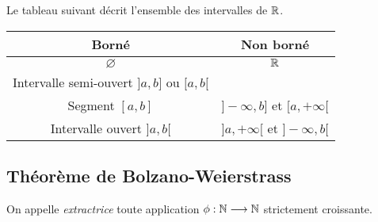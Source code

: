 \documentclass[../main.tex]{subfiles}
\begin{document}
\begin{prop}
    Le tableau suivant décrit l'ensemble des intervalles de $\mathbb R$.
    \begin{center}
    \begin{tabular}{|c|c|} \hline
        Borné & Non borné \\ \hline
        $\varnothing$ & $\mathbb R$ \\ \hline
        Intervalle semi-ouvert $]a,b]$ ou $[a,b[$ & \\ \hline
        Segment $[a,b]$ & $]-\infty,b]$ et $[a,+\infty[$ \\ \hline
        Intervalle ouvert $]a,b[$ & $]a,+\infty[$ et $]-\infty,b[$ \\ \hline
    \end{tabular}
    \end{center}
\end{prop}

\begin{comment}
\subsection{Densité d'une partie de $\R$}

\begin{mydef}[Densité]
    On dit que $A$ est dense dans $\R$ si pour tous réels $x$ et $y$ il existe un $a\in A\cap {]x,y[}$.
\end{mydef}

\begin{thm}[Propriété d'archimède]
    Soient $x<y$ deux réels avec $x>0$. Alors il existe $n\in\N$ tel que $y\leq nx$.
\end{thm}

\begin{prop}
    L'ensemble $\Q$ des nombres rationnels est dense dans $\R$.
\end{prop}

\begin{exo}[D]
    Le démontrer.
\end{exo}
\end{comment}

\subsection{Théorème de Bolzano-Weierstrass}

\begin{mydef}[Extractrice]
	On appelle \textit{extractrice} toute application $\phi:\mathbb N\longrightarrow\mathbb N$ strictement croissante.
\end{mydef}
\end{document}
